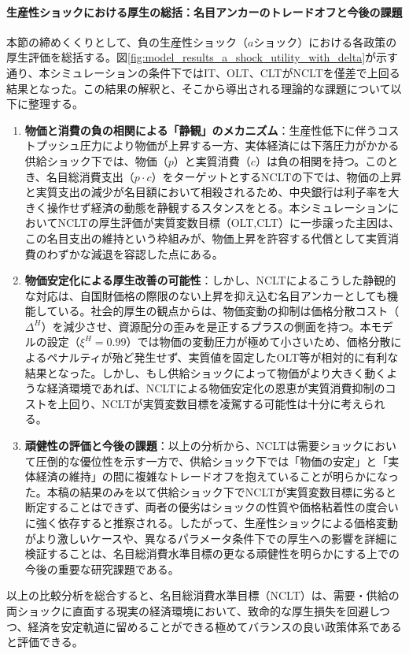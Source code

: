 \paragraph{生産性ショックにおける厚生の総括：名目アンカーのトレードオフと今後の課題}\label{sec:model_results_a_shock_asad_analysis_summary}
本節の締めくくりとして、負の生産性ショック（\(a\)ショック）における各政策の厚生評価を総括する。図\ref{fig:model_results_a_shock_utility_with_delta}が示す通り、本シミュレーションの条件下ではIT、OLT、CLTがNCLTを僅差で上回る結果となった。この結果の解釈と、そこから導出される理論的な課題について以下に整理する。

\begin{enumerate}
    \item\label{itm:model_results_a_shock_asad_analysis_summary_mechanism} \textbf{物価と消費の負の相関による「静観」のメカニズム}：生産性低下に伴うコストプッシュ圧力により物価が上昇する一方、実体経済には下落圧力がかかる供給ショック下では、物価（\(p\)）と実質消費（\(c\)）は負の相関を持つ。このとき、名目総消費支出（\(p\cdot c\)）をターゲットとするNCLTの下では、物価の上昇と実質支出の減少が名目額において相殺されるため、中央銀行は利子率を大きく操作せず経済の動態を静観するスタンスをとる。本シミュレーションにおいてNCLTの厚生評価が実質変数目標（OLT,CLT）に一歩譲った主因は、この名目支出の維持という枠組みが、物価上昇を許容する代償として実質消費のわずかな減退を容認した点にある。
    \item\label{itm:model_results_a_shock_asad_analysis_summary_welfare} \textbf{物価安定化による厚生改善の可能性}：しかし、NCLTによるこうした静観的な対応は、自国財価格の際限のない上昇を抑え込む名目アンカーとしても機能している。社会的厚生の観点からは、物価変動の抑制は価格分散コスト（\(\Delta^H\)）を減少させ、資源配分の歪みを是正するプラスの側面を持つ。本モデルの設定（\(\xi^H=0.99\)）では物価の変動圧力が極めて小さいため、価格分散によるペナルティが殆ど発生せず、実質値を固定したOLT等が相対的に有利な結果となった。しかし、もし供給ショックによって物価がより大きく動くような経済環境であれば、NCLTによる物価安定化の恩恵が実質消費抑制のコストを上回り、NCLTが実質変数目標を凌駕する可能性は十分に考えられる。
    \item\label{itm:model_results_a_shock_asad_analysis_summary_robustness} \textbf{頑健性の評価と今後の課題}：以上の分析から、NCLTは需要ショックにおいて圧倒的な優位性を示す一方で、供給ショック下では「物価の安定」と「実体経済の維持」の間に複雑なトレードオフを抱えていることが明らかになった。本稿の結果のみを以て供給ショック下でNCLTが実質変数目標に劣ると断定することはできず、両者の優劣はショックの性質や価格粘着性の度合いに強く依存すると推察される。したがって、生産性ショックによる価格変動がより激しいケースや、異なるパラメータ条件下での厚生への影響を詳細に検証することは、名目総消費水準目標の更なる頑健性を明らかにする上での今後の重要な研究課題である。
\end{enumerate}

以上の比較分析を総合すると、名目総消費水準目標（NCLT）は、需要・供給の両ショックに直面する現実の経済環境において、致命的な厚生損失を回避しつつ、経済を安定軌道に留めることができる極めてバランスの良い政策体系であると評価できる。